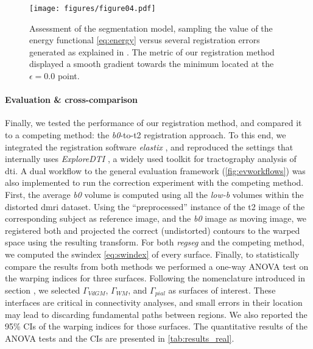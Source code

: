 \begin{figure}
	\texttt{[image: figures/figure04.pdf]}
	\caption{Assessment of the segmentation model, sampling the value of the energy functional
	\eqref{eq:energy} versus several registration errors generated as explained in
	.
	The metric of our registration method displayed a smooth gradient towards the minimum
	located at the $\epsilon = 0.0$ point.}\label{fig:energymap}
\end{figure}

\paragraph*{Evaluation \& cross-comparison}\label{sec:res_cc_evaluation}
%
Finally, we tested the performance of our registration method, and compared it to a competing
  method: the \emph{b0}-to-\gls*{t2} registration approach.
To this end, we integrated the registration software \emph{elastix} \citep{klein_elastix_2010},
  and reproduced the settings that internally uses \emph{ExploreDTI}
  \citep{leemans_exploredti_2009}, a widely used toolkit for tractography analysis of
  \gls*{dti}.
A dual workflow to the general evaluation framework (\autoref{fig:evworkflows})
  was also implemented to run the correction experiment with the competing method.
First, the average \emph{b0} volume is computed using all the \emph{low-b} volumes within
  the distorted \gls*{dmri} dataset.
Using the ``preprocessed'' instance of the \gls*{t2} image of the corresponding subject as
  reference image, and the \emph{b0} image as moving image, we registered both and
  projected the correct (undistorted) contours to the warped space using the resulting
  transform.
For both \emph{regseg} and the competing method, we computed the \gls*{swindex} \eqref{eq:swindex}
  of every surface.
Finally, to statistically compare the results from both methods we performed a one-way ANOVA test
  on the warping indices for three surfaces.
Following the nomenclature introduced in section , we selected
  $\Gamma_{VdGM}$, $\Gamma_{WM}$, and $\Gamma_{pial}$ as surfaces of interest.
These interfaces are critical in connectivity analyses, and small errors in their location may
  lead to discarding fundamental paths between regions.
We also reported the 95\% CIs of the warping indices for those surfaces.
The quantitative results of the ANOVA tests and the CIs are presented in \autoref{tab:results_real}.

